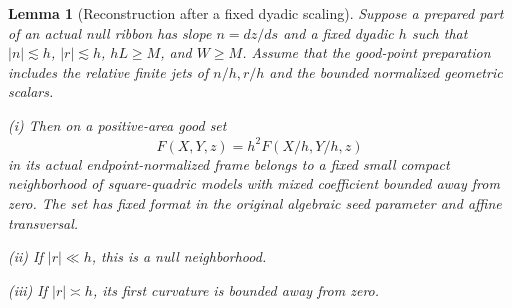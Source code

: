 \documentclass[11pt]{amsart}
\newtheorem{lemma}[theorem]{Lemma}
\theoremstyle{definition}
\theoremstyle{remark}
\numberwithin{equation}{section}
\begin{document}
\begin{lemma}[Reconstruction after a fixed dyadic scaling]\label{low:4:sf:lem:newreconstruction}
Suppose a prepared part of an actual null ribbon has slope $n=dz/ds$ and a fixed dyadic $h$ such that $|n|\lesssim h$, $|r|\lesssim h$, $hL\ge M$, and $W\ge M$. Assume that the good-point preparation includes the relative finite jets of $n/h,r/h$ and the bounded normalized geometric scalars.

\noindent\textup{(i)} Then on a positive-area good set
\[
 \widehat F(X,Y,z)=h^2F(X/h,Y/h,z)
\]
in its actual endpoint-normalized frame belongs to a fixed small compact neighborhood of square-quadric models with mixed coefficient bounded away from zero. The set has fixed format in the original algebraic seed parameter and affine transversal.

\noindent\textup{(ii)} If $|r|\ll h$, this is a null neighborhood.

\noindent\textup{(iii)} If $|r|\asymp h$, its first curvature is bounded away from zero.
\end{lemma}
\end{document}
